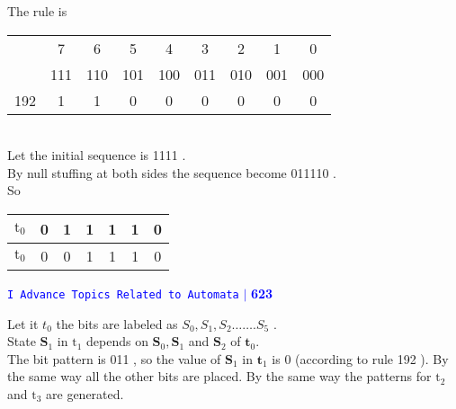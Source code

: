 \documentclass[a4]{article}
\begin{document}
{{	The rule is
	\vspace*{0.2cm}
	\begin{center}
		\begin{tabular}{ccccccccc}
			\hline & 7 & 6 & 5 & 4 & 3 & 2 & 1 & 0 \\
			& 111 & 110 & 101 & 100 & 011 & 010 & 001 & 000 \\
			192 & 1 & 1 & 0 & 0 & 0 & 0 & 0 & 0 \\
			\hline
		\end{tabular}
	\end{center}
	\vspace*{0.5cm}\\
	Let the initial sequence is 1111 .\\
	By null stuffing at both sides the sequence become 011110 .\\
	So
	\vspace*{0.2cm}
	\begin{center}
		\begin{tabular}{ccccccc}
			\hline
			$\mathrm{t}_{0}$\hspace*{0.7cm}& 0\hspace*{0.7cm}& 1\hspace*{0.7cm}& 1\hspace*{0.7cm}& 1\hspace*{0.7cm}& 1\hspace*{0.7cm}& 0\\
			\hline
			\hline
			$\mathrm{t}_{0}$\hspace*{0.7cm}& 0\hspace*{0.7cm}& 0\hspace*{0.7cm}& 1\hspace*{0.7cm}& 1\hspace*{0.7cm}& 1\hspace*{0.7cm}& 0\\
			\hline
		\end{tabular} 
	\end{center}
	
	\newpage	
	\begin{flushright}
		\textcolor{blue}{\hspace*{0.5cm} \texttt{I Advance Topics Related to Automata} \hspace*{0.1cm}\textbf{$|$} \textbf{623}}
	\end{flushright}

	\vspace*{0.5cm}	
	Let it $t_{0}$ the bits are labeled as $S_{0}, S_{1}, S_{2} \ldots \ldots . S_{5}$ .\\
	State $\mathbf{S}_{1}$ in $\mathrm{t}_{1}$ depends on $\mathbf{S}_{0}, \mathbf{S}_{1}$ and $\mathbf{S}_{2}$ of $\mathbf{t}_{0}$.\\
	The bit pattern is 011 , so the value of $\mathbf{S}_{1}$ in $\mathbf{t}_{1}$ is 0 (according to rule 192 ). By the same way all the other bits are placed. By the same way the patterns for $\mathrm{t}_{2}$ and $\mathrm{t}_{3}$ are generated.
	 
}}
\end{document}
